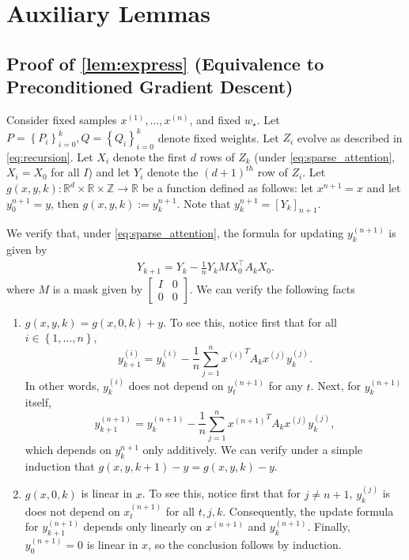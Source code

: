 \documentclass{article}
\newcommand{\R}{\mathbb{R}}
\newcommand{\wstar}{w_\star}
\newcommand{\tx}[1]{x^{(#1)}}
\newcommand{\ty}[1]{y^{(#1)}}
\newcommand*\lrb[1]{\left[ #1 \right]}
\newcommand*\lrbb[1]{\left\{ #1 \right\}}
\begin{document}
\section{Auxiliary Lemmas}

\subsection{Proof of \autoref{lem:express} (Equivalence to Preconditioned Gradient Descent)}
 \label{pf:express}
Consider fixed samples $\tx{1}, \dots, \tx{n}$, and fixed $\wstar$. Let $P=\lrbb{P_i}_{i=0}^k,Q=\lrbb{Q_i}_{i=0}^k$ denote fixed weights. Let $Z_i$ evolve as described in \eqref{eq:recursion}. Let $X_i$ denote the first $d$ rows of $Z_k$ (under \eqref{eq:sparse_attention}, $X_i=X_0$ for all $I$) and let $Y_i$ denote the $(d+1)^{th}$ row of $Z_i$. Let $g(x,y,k) : \R^d \times \R \times \mathbb{Z} \to \R$ be a function defined as follows: let $x^{n+1} = x$ and let $y^{n+1}_0 = y$, then $g(x,y,k) := y^{n+1}_k$. Note that $y^{n+1}_k = \lrb{Y_k}_{n+1}$.

We verify that, under \eqref{eq:sparse_attention}, the formula for updating $\ty{n+1}_k$ is given by
\begin{align*}
Y_{k+1}  = Y_{k}  - \frac{1}{n} Y_{k} M X_{0}^\top A_k X_{0}.
\end{align*}
where $M$ is a mask given by $\begin{bmatrix}
I & 0 \\0 & 0
\end{bmatrix}$. We can verify the following facts

\begin{enumerate}
\item $g(x,y,k) = g(x,0,k) + y$. To see this, notice first that for all $i \in \lrbb{1,\dots,n}$, 
$$\ty{i}_{k+1} = \ty{i}_{k} - \frac{1}{n} \sum_{j=1}^{n} {\tx{i}}^T A_k \tx{j} \ty{j}_k.$$ 
In other words, $\ty{i}_k$ does not depend on $\ty{n+1}_t$ for any $t$.  Next, for $\ty{n+1}_k$ itself, 
$$\ty{n+1}_{k+1} = \ty{n+1}_{k} - \frac{1}{n} \sum_{j=1}^{n} {\tx{n+1}}^T A_k \tx{j} \ty{j}_k,$$
which depends on $y^{n+1}_k$ only additively. We can verify under a simple induction that $g(x,y,k+1) - y = g(x,y,k) -y$.

\item $g(x,0,k)$ is linear in $x$. To see this, notice first that for $j \neq n+1$, $\ty{j}_k$ is does not depend on $\tx{n+1}_t$ for all $t,j,k$. Consequently, the update formula for $\ty{n+1}_{k+1}$ depends only linearly on $\tx{n+1}$ and $\ty{n+1}_k$. Finally, $\ty{n+1}_0 = 0$ is linear in $x$, so the conclusion follows by induction.
\end{enumerate}
\end{document}

